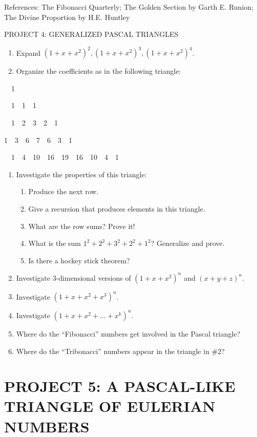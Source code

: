 \documentclass{article}
\begin{document}
References:  The Fibonacci Quarterly; The Golden Section by Garth E. Runion; The Divine Proportion by H.E. Huntley

PROJECT 4: GENERALIZED PASCAL TRIANGLES

\begin{enumerate}
\item Expand $\left(1+x+x^2\right)^2,\left(1+x+x^2\right)^3,\left(1+x+x^2\right)^4$.
\item Organize the coefficients as in the following triangle: 
\end{enumerate}
\ \ 1

\ \ 1\ \ 1\ \ 1

\ \ 1\ \ 2\ \ 3\ \ 2\ \ 1

1\ \ 3\ \ 6\ \ 7\ \ 6\ \ 3\ \ 1

\ \ 1\ \ 4\ \ 10\ \ 16\ \ 19\ \ 16\ \ 10\ \ 4\ \ 1

\begin{enumerate}
\item Investigate the properties of this triangle:

\begin{enumerate}
\item Produce the next row.
\item Give a recursion that produces elements in this triangle.
\item What are the row sums? Prove it!
\item What is the sum  $1^2+2^2+3^2+2^2+1^2$? Generalize and prove.
\item Is there a hockey stick theorem?
\end{enumerate}
\item Investigate 3-dimensional versions of  $\left(1+x+x^2\right)^n$ and  $\left(x+y+z\right)^n.$
\item Investigate  $\left(1+x+x^2+x^3\right)^n$.
\item Investigate  $\left(1+x+x^2+{\dots}+x^k\right)^n$.  
\item Where do the “Fibonacci” numbers get involved in the Pascal triangle?
\item Where do the “Tribonacci” numbers appear in the triangle in \#2?
\end{enumerate}
\section[PROJECT 5: A PASCAL{}-LIKE TRIANGLE OF EULERIAN NUMBERS]{PROJECT 5: A PASCAL-LIKE TRIANGLE OF EULERIAN NUMBERS}
\end{document}
